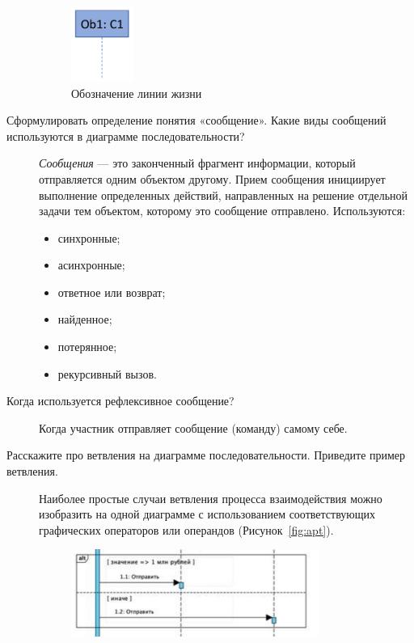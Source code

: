 \begin{description}
		\begin{figure}[h!tp]
			\centering
			\includegraphics[width=0.2\textwidth]{Screenshot from 2023-03-18 18-02-21.png}
			\caption{Обозначение линии жизни}
			\label{fig:mngfck}
		\end{figure}
	\item[Сформулировать определение понятия «сообщение». Какие виды
		сообщений используются в диаграмме последовательности?]
		\textit{Сообщения} --- это законченный фрагмент
		информации, который отправляется одним объектом
		другому. Прием сообщения инициирует выполнение
		определенных действий, направленных на решение
		отдельной задачи тем объектом, которому это
		сообщение отправлено.
		Используются:
		\begin{itemize}
			\item синхронные;
			\item асинхронные;
			\item ответное или возврат;
			\item найденное;
			\item потерянное;
			\item рекурсивный вызов.
		\end{itemize}
	\item[Когда используется рефлексивное сообщение?]
		Когда участник отправляет сообщение (команду) самому себе.
	\item[Расскажите про ветвления на диаграмме последовательности. Приведите
		пример ветвления.]
		Наиболее простые случаи ветвления процесса взаимодействия можно
		изобразить на одной диаграмме с использованием соответствующих
		графических операторов или операндов (Рисунок~\ref{fig:apt}).
		\begin{figure}[h!tp]
			\centering
			\includegraphics[width=0.8\textwidth]{Screenshot from 2023-03-18 18-14-47.png}

\end{figure}
\end{description}
